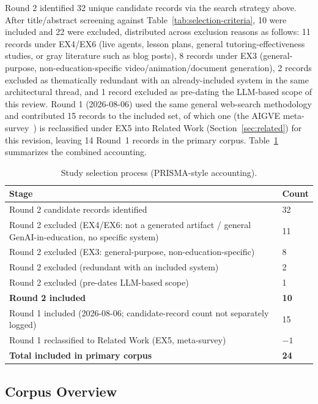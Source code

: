\documentclass[journal]{IEEEtran}
\begin{document}
Round 2 identified 32 unique candidate records via the search strategy above. After title/abstract screening against Table~\ref{tab:selection-criteria}, 10 were included and 22 were excluded, distributed across exclusion reasons as follows: 11 records under EX4/EX6 (live agents, lesson plans, general tutoring-effectiveness studies, or gray literature such as blog posts), 8 records under EX3 (general-purpose, non-education-specific video/animation/document generation), 2 records excluded as thematically redundant with an already-included system in the same architectural thread, and 1 record excluded as pre-dating the LLM-based scope of this review. Round 1 (2026-08-06) used the same general web-search methodology and contributed 15 records to the included set, of which one (the AIGVE meta-survey~\cite{liu2024aigve}) is reclassified under EX5 into Related Work (Section~\ref{sec:related}) for this revision, leaving 14 Round~1 records in the primary corpus. Table~\ref{tab:prisma} summarizes the combined accounting.

\begin{table}[t]
\caption{Study selection process (PRISMA-style accounting).}
\label{tab:prisma}
\centering
\begin{tabular}{p{5.2cm}p{2.3cm}}
\hline
\textbf{Stage} & \textbf{Count} \\
\hline
Round 2 candidate records identified & 32 \\
Round 2 excluded (EX4/EX6: not a generated artifact / general GenAI-in-education, no specific system) & 11 \\
Round 2 excluded (EX3: general-purpose, non-education-specific) & 8 \\
Round 2 excluded (redundant with an included system) & 2 \\
Round 2 excluded (pre-dates LLM-based scope) & 1 \\
\textbf{Round 2 included} & \textbf{10} \\
Round 1 included (2026-08-06; candidate-record count not separately logged) & 15 \\
Round 1 reclassified to Related Work (EX5, meta-survey) & $-1$ \\
\hline
\textbf{Total included in primary corpus} & \textbf{24} \\
\hline
\end{tabular}
\end{table}

\subsection{Corpus Overview}
\end{document}

